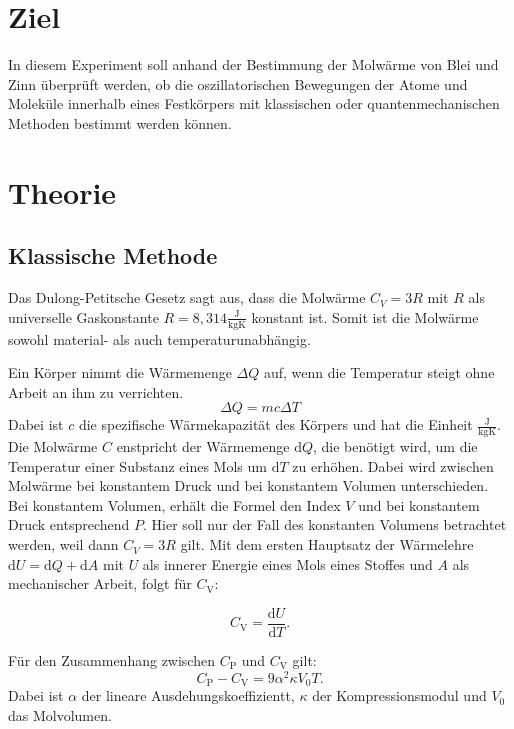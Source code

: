 \section{Ziel}
\label{sec:ziel}
In diesem Experiment soll anhand der Bestimmung der Molwärme von Blei und Zinn überprüft werden, ob die oszillatorischen Bewegungen der Atome und Moleküle innerhalb eines Festkörpers mit klassischen oder quantenmechanischen Methoden bestimmt werden können.

\section{Theorie}
\label{sec:theorie}

 \subsection{Klassische Methode}
Das Dulong-Petitsche Gesetz sagt aus, dass die Molwärme $C_{V} = 3R$ mit $R$ als universelle Gaskonstante $R = 8,314 \frac{\si{\joule}}{\si{\kilogram \kelvin}}$ \cite{codata} konstant ist. Somit ist die Molwärme sowohl material- als auch temperaturunabhängig.

Ein Körper nimmt die Wärmemenge $\Delta Q$ auf, wenn die Temperatur steigt ohne Arbeit an ihm zu verrichten.
\begin{equation}
  \Delta Q = mc \Delta T
\end{equation}
Dabei ist $c$ die spezifische Wärmekapazität des Körpers und hat die Einheit $\frac{\si{\joule}}{\si{\kilogram \kelvin}}$.
Die Molwärme $C$ enstpricht der Wärmemenge $\mathrm{d}Q$, die benötigt wird, um die Temperatur einer Substanz eines Mols um $\mathrm{d}T$ zu erhöhen. Dabei wird zwischen Molwärme bei konstantem Druck und bei konstantem Volumen unterschieden. Bei konstantem Volumen, erhält die Formel den Index $V$ und bei konstantem Druck entsprechend $P$. Hier soll nur der Fall des konstanten Volumens betrachtet werden, weil dann $C_{V} = 3R$ gilt.
Mit dem ersten Hauptsatz der Wärmelehre $\mathrm{d}U = \mathrm{d}Q + \mathrm{d}A$ mit $U$ als innerer Energie eines Mols eines Stoffes und $A$ als mechanischer Arbeit, folgt für $C_\mathrm{V}$:

\begin{equation}
  C_\mathrm{V} = \frac{\mathrm{d}U}{\mathrm{d}T}.
\end{equation}

Für den Zusammenhang zwischen $C_\mathrm{P}$ und $C_\mathrm{V}$ gilt:
\begin{equation}
  \label{eqn:CvCp}
  C_\mathrm{P}-C_\mathrm{V} = 9 \alpha^2\kappa V_0 T.
\end{equation}
Dabei ist $\alpha$ der lineare Ausdehungskoeffizientt, $\kappa$ der Kompressionsmodul und $V_0$ das Molvolumen.

